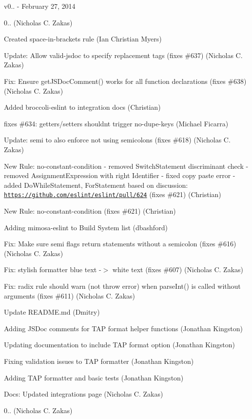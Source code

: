 v0.. -\/ February 27, 2014


\begin{DoxyItemize}
\item 0.. (Nicholas C. Zakas)
\item Created space-\/in-\/brackets rule (Ian Christian Myers)
\item Update\+: Allow valid-\/jsdoc to specify replacement tags (fixes \#637) (Nicholas C. Zakas)
\item Fix\+: Ensure get\+J\+S\+Doc\+Comment() works for all function declarations (fixes \#638) (Nicholas C. Zakas)
\item Added broccoli-\/eslint to integration docs (Christian)
\item fixes \#634\+: getters/setters shouldn\textquotesingle{}t trigger no-\/dupe-\/keys (Michael Ficarra)
\item Update\+: semi to also enforce not using semicolons (fixes \#618) (Nicholas C. Zakas)
\item New Rule\+: no-\/constant-\/condition -\/ removed Switch\+Statement discriminant check -\/ removed Assignment\+Expression with right Identifier -\/ fixed copy paste error -\/ added Do\+While\+Statement, For\+Statement based on discussion\+: \href{https://github.com/eslint/eslint/pull/624}{\tt https\+://github.\+com/eslint/eslint/pull/624} (fixes \#621) (Christian)
\item New Rule\+: no-\/constant-\/condition (fixes \#621) (Christian)
\item Adding mimosa-\/eslint to Build System list (dbashford)
\item Fix\+: Make sure semi flags return statements without a semicolon (fixes \#616) (Nicholas C. Zakas)
\item Fix\+: stylish formatter blue text -\/$>$ white text (fixes \#607) (Nicholas C. Zakas)
\item Fix\+: radix rule should warn (not throw error) when parse\+Int() is called without arguments (fixes \#611) (Nicholas C. Zakas)
\item Update R\+E\+A\+D\+M\+E.\+md (Dmitry)
\item Adding J\+S\+Doc comments for T\+AP format helper functions (Jonathan Kingston)
\item Updating documentation to include T\+AP format option (Jonathan Kingston)
\item Fixing validation issues to T\+AP formatter (Jonathan Kingston)
\item Adding T\+AP formatter and basic tests (Jonathan Kingston)
\item Docs\+: Updated integrations page (Nicholas C. Zakas)
\item 0.. (Nicholas C. Zakas)
\end{DoxyItemize}

